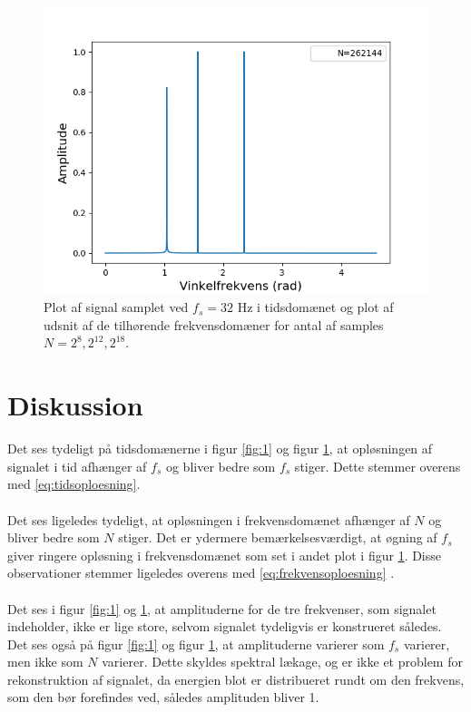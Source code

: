 \begin{figure}[H]
\begin{minipage}{0.49\textwidth}
\includegraphics[width=\textwidth]{figures/frekvensanalyse/32hz_freq3.png}
\end{minipage}
\caption{Plot af signal samplet ved $f_s=32$ Hz i tidsdomænet og plot af udsnit af de tilhørende frekvensdomæner for antal af samples $N=2^8, 2^{12}, 2^{18}$.}
\label{fig:2}
\end{figure}

\section{Diskussion}
Det ses tydeligt på tidsdomænerne i figur \ref{fig:1} og figur \ref{fig:2}, at opløsningen af signalet i tid afhænger af $f_s$ og bliver bedre som $f_s$ stiger. Dette stemmer overens med \eqref{eq:tidsoploesning}.
\\ \\
Det ses ligeledes tydeligt, at opløsningen i frekvensdomænet afhænger af $N$ og bliver bedre som $N$ stiger. Det er ydermere bemærkelsesværdigt, at øgning af $f_s$ giver ringere opløsning i frekvensdomænet som set i andet plot i figur \ref{fig:2}. Disse observationer stemmer ligeledes overens med \eqref{eq:frekvensoploesning} .
\\ \\
Det ses i figur \ref{fig:1} og \ref{fig:2}, at amplituderne for de tre frekvenser, som signalet indeholder, ikke er lige store, selvom signalet tydeligvis er konstrueret således. Det ses også på figur \ref{fig:1} og figur \ref{fig:2}, at amplituderne varierer som $f_s$ varierer, men ikke som $N$ varierer. Dette skyldes spektral lækage, og er ikke et problem for rekonstruktion af signalet, da energien blot er distribueret rundt om den frekvens, som den bør forefindes ved, således amplituden bliver 1.

